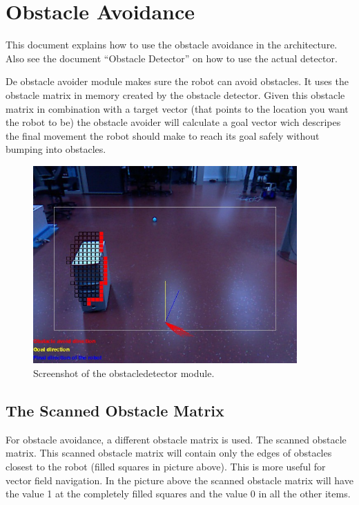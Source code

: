 \documentclass[a4paper, 12pt, oneside]{report}
\title{\titleVariable}
\author{\authorVariable}
\date{\centering First release: \firstRelease \\ Last modification: \today}
\begin{document}
\maketitle

\chapter{Obstacle Avoidance}

This document explains how to use the obstacle avoidance in the architecture. 
Also see the document ``Obstacle Detector'' on how to use the actual detector.

De obstacle avoider module makes sure the robot can avoid obstacles. 
It uses the obstacle matrix in memory created by the obstacle detector. 
Given this obstacle matrix in combination with a target vector (that points to the location you want the robot to be) the obstacle avoider will calculate a goal vector wich descripes the final movement the robot should make to reach its goal safely without bumping into obstacles.

\begin{figure}[H]
    \centering
    \includegraphics[width=0.9\textwidth]{../vision/img/obstacledetector_example.png}
    \caption{Screenshot of the obstacledetector module.\label{fig:example}}
\end{figure}

\section{The Scanned Obstacle Matrix}
For obstacle avoidance, a different obstacle matrix is used. 
The scanned obstacle matrix. 
This scanned obstacle matrix will contain only the edges of obstacles closest to the robot (filled squares in picture above). 
This is more useful for vector field navigation. 
In the picture above the scanned obstacle matrix will have the value 1 at the completely filled squares and the value 0 in all the other items.
\end{document}

